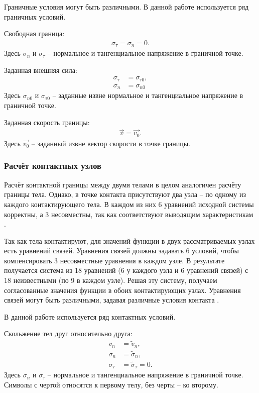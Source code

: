 Граничные условия могут быть различными. В данной работе используется ряд граничных условий.

Свободная граница:
\begin{align}
\sigma_\tau=\sigma_n=0.
\end{align}
Здесь $\sigma_n$ и $\sigma_\tau$ -- нормальное и тангенциальное напряжение в граничной точке.

Заданная внешняя сила:
\begin{align}
\sigma_\tau &= \sigma_{\tau 0}, \nonumber\\
\sigma_n &= \sigma_{n 0}
\end{align}
Здесь $\sigma_{n 0}$ и $\sigma_{\tau 0}$ -- заданные извне нормальное и тангенциальное напряжение в граничной точке.

Заданная скорость границы:
\begin{align}
\vec{v} = \vec{v_0}.
\end{align}
Здесь $\vec{v_0}$ -- заданный извне вектор скорости в точке границы.


\subsubsection{Расчёт контактных узлов}

Расчёт контактной границы между двумя телами в целом аналогичен расчёту границы тела. Однако, в точке контакта присутствуют два узла -- по одному из каждого контактирующего тела. В каждом из них 6 уравнений исходной системы корректны, а 3 несовместны, так как соответствуют выводящим характеристикам \cite{agapov_petrov_chelnokov_2002, b}.

Так как тела контактируют, для значений функции в двух рассматриваемых узлах есть уравнений связей. Уравнения связей должны задавать 6 условий, чтобы компенсировать 3 несовместные уравнения в каждом узле. В результате получается система из 18 уравнений (6 у каждого узла и 6 уравнений связей) с 18 неизвестными (по 9 в каждом узле). Решая эту систему, получаем согласованные значения функции в обоих контактирующих узлах. Уравнения связей могут быть различными, задавая различные условия контакта \cite{petrov_chelnokov, matyushev_petrov}.

В данной работе используется ряд контактных условий.

Скольжение тел друг относительно друга:
\begin{align}
v_n&=\tilde{v}_n,\nonumber\\
\sigma_n&=\tilde{\sigma}_n,\nonumber\\
\sigma_\tau&=\tilde{\sigma}_\tau=0.
\end{align}
Здесь $\sigma_n$ и $\sigma_\tau$ -- нормальное и тангенциальное напряжение в граничной точке. Символы с чертой относятся к первому телу, без черты -- ко второму.

